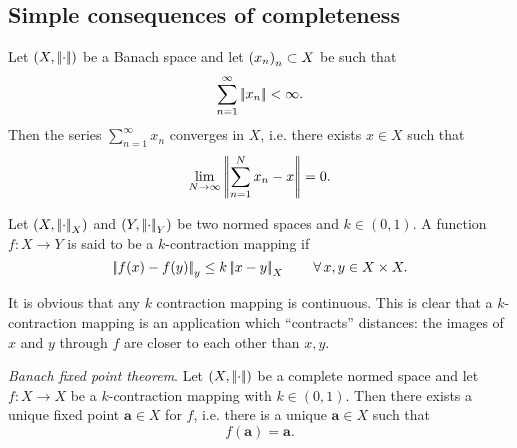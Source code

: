 \documentclass{article}
\begin{document}
\subsection{Simple consequences of completeness}
\begin{proposition}
	Let $\left(X,\left|\negthinspace\left|\cdot\right|\negthinspace\right|\right)$ be a Banach space and let ${\left({x}_{n}\right)}_{n}\subset X$ be such that
	\begin{equation*}
		\sum_{n=1}^{\infty}\left|\negthinspace\left|x_{n}\right|\negthinspace\right|<\infty.
	\end{equation*}
	Then the series $\sum_{n=1}^{\infty}x_{n}$ converges in $X$, i.e. there exists $x\in X$ such that
	\begin{equation*}
		\lim_{N\to\infty}\left|\negthinspace\left|\sum_{n=1}^{N}x_{n}-x\right|\negthinspace\right|=0.
	\end{equation*}
\end{proposition}
\begin{definition}
	Let $\left(X,\left|\negthinspace\left|\cdot\right|\negthinspace\right|_{X}\right)$ and $\left(Y,\left|\negthinspace\left|\cdot\right|\negthinspace\right|_{Y}\right)$ be two normed spaces and $k\in(0,1)$. A function $f:X\to Y$ is said to be a $k$-contraction mapping if
	\begin{equation*}
		\left|\negthinspace\left|f(x)-f(y)\right|\negthinspace\right|_{y}\leq k\left|\negthinspace\left|x-y\right|\negthinspace\right|_{X}\qquad\forall\, x,y\in X\times X.
	\end{equation*}
\end{definition}
It is obvious that any $k$ contraction mapping is continuous. This is clear that a $k$-contraction mapping is an application which ``contracts'' distances: the images of $x$ and $y$ through $f$ are closer to each other than $x,y$.
\begin{theorem}
	\emph{Banach fixed point theorem}. Let $\left(X,\left|\negthinspace\left|\cdot\right|\negthinspace\right|\right)$ be a complete normed space and let $f:X\to X$ be a $k$-contraction mapping with $k\in(0,1)$. Then there exists a unique fixed point $\bm{a}\in X$ for $f$, i.e. there is a unique $\bm{a}\in X$ such that
	\begin{equation*}
		f(\bm{a})=\bm{a}.
	\end{equation*}
\end{theorem}
\end{document}
